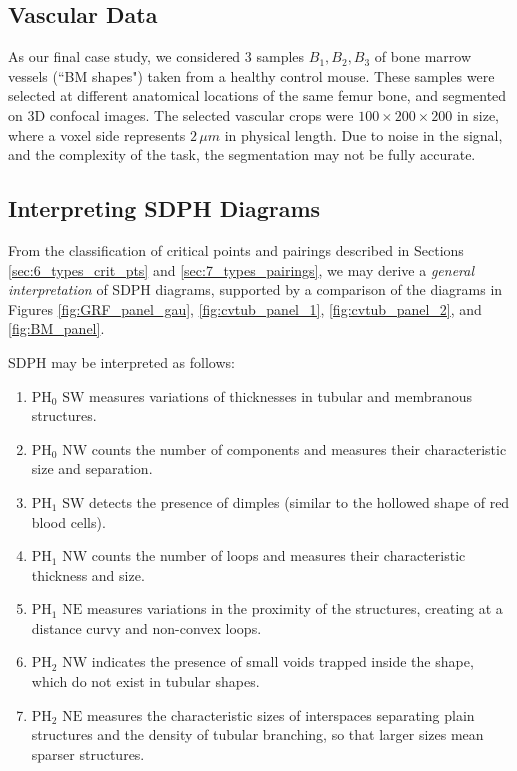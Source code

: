 \documentclass[11pt]{article}
\newcommand{\PH}{\mathrm{PH}}
\newcommand{\SW}{\mathrm{SW}}
\newcommand{\NW}{\mathrm{NW}}
\newcommand{\NE}{\mathrm{NE}}
\theoremstyle{plain}
\theoremstyle{definition}
\theoremstyle{remark}
\begin{document}
	\subsection{Vascular Data}
	\label{sec:bio_applis}
	
	As our final case study, we considered $3$ samples $B_1, B_2, B_3$ of bone marrow vessels (``BM shapes") taken from a healthy control mouse. These samples were selected at different anatomical locations of the same femur bone, and segmented on 3D confocal images. The selected vascular crops were $100 \times 200 \times 200$ in size, where a voxel side represents $2 \, \mu m$ in physical length. Due to noise in the signal, and the complexity of the task, the segmentation may not be fully accurate.
	
	
	\subsection{Interpreting SDPH Diagrams}
	\label{sec:interpret_applis}
	
	From the classification of critical points and pairings described in Sections \ref{sec:6_types_crit_pts} and \ref{sec:7_types_pairings}, we may derive a \textit{general interpretation} of SDPH diagrams, supported by a comparison of the diagrams in Figures \ref{fig:GRF_panel_gau}, \ref{fig:cvtub_panel_1}, \ref{fig:cvtub_panel_2}, and \ref{fig:BM_panel}.
	
	SDPH may be interpreted as follows:
	\begin{enumerate}
		\item $\PH_0$ $\SW$ measures variations of thicknesses in tubular and membranous structures.
		\item $\PH_0$ $\NW$ counts the number of components and measures their characteristic size and separation. 
		\item $\PH_1$ $\SW$ detects the presence of dimples (similar to the hollowed shape of red blood cells). 
		\item $\PH_1$ $\NW$ counts the number of loops and measures their characteristic thickness and size. 
		\item $\PH_1$ $\NE$ measures variations in the proximity of the structures, creating at a distance curvy and non-convex loops. 
		\item $\PH_2$ $\NW$ indicates the presence of small voids trapped inside the shape, which do not exist in tubular shapes. 
		\item $\PH_2$ $\NE$ measures the characteristic sizes of interspaces separating plain structures and the density of tubular branching, so that larger sizes mean sparser structures. 
	\end{enumerate}
	
\end{document}
